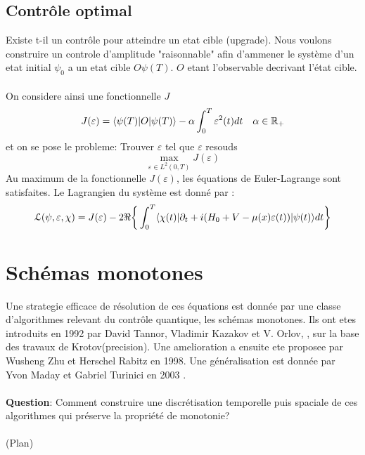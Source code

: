 \subsection*{Contrôle optimal}
Existe t-il un contrôle pour atteindre un etat cible (upgrade).
Nous voulons construire un controle d'amplitude "raisonnable" afin d'ammener le système d'un etat initial $\psi_0$ a un etat cible $O\psi(T)$. $O$ etant l'observable decrivant l'état cible.\\\\
On considere ainsi une fonctionnelle $J$
\begin{equation}
J(\varepsilon) = \langle \psi(T)|O|\psi(T) \rangle - \alpha \int_{0}^{T}\varepsilon^2(t)dt \quad \alpha \in \mathbb R_+
\end{equation}
et on se pose le probleme: Trouver $\varepsilon$ tel que $\varepsilon$ resouds
$$ \max_{\varepsilon \in L^2(0,T)} J(\varepsilon)$$
Au maximum de la fonctionnelle $J(\varepsilon)$, les équations de Euler-Lagrange sont satisfaites. Le Lagrangien du système est donné par :
\begin{equation} \label{lagrangien}
\mathcal{L}(\psi,\varepsilon,\chi)= J(\varepsilon)\\
-2\Re \bigg\{ \int_{0}^{T}\langle \chi (t)|\partial_{t}+i(H_0+V-\mu(x)\varepsilon(t))|\psi(t) \rangle dt \bigg\}
\end{equation}
\section*{Schémas monotones}
Une strategie efficace de résolution de ces équations est donnée par une classe d’algorithmes relevant du contrôle quantique, les schémas monotones. Ils ont etes introduits en 1992 par David Tannor, Vladimir Kazakov et V. Orlov,  \cite{Tannor}, sur la base des travaux de Krotov(precision). Une amelioration a ensuite ete proposee par Wusheng Zhu et Herschel Rabitz \cite{Zhu} en 1998. Une généralisation est donnée par Yvon Maday et Gabriel Turinici en 2003 \cite{Maday}.\\\\
\textbf{Question}: Comment construire une discrétisation temporelle puis spaciale de ces algorithmes qui préserve la propriété de monotonie?\\\\
(Plan)


